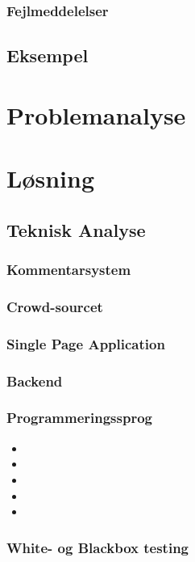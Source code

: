 \documentclass[final]{rapport1}
\begin{document}
\subsection{Fejlmeddelelser}
\section{Eksempel}

\clearpage
\chapter{Problemanalyse}

\chapter{Løsning}
\section{Teknisk Analyse}
\subsection{Kommentarsystem}


\subsection{Crowd-sourcet}

\subsection{Single Page Application}

\subsection{Backend}

\subsection{Programmeringssprog}
\begin{itemize}
\item 
\item 
\item 
\item 
\item 
\end{itemize}

\subsection{White- og Blackbox testing}
\end{document}
